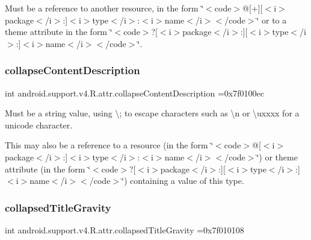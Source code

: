 Must be a reference to another resource, in the form \char`\"{}$<$code$>$@\mbox{[}+\mbox{]}\mbox{[}$<$i$>$package$<$/i$>$\+:\mbox{]}$<$i$>$type$<$/i$>$\+:$<$i$>$name$<$/i$>$$<$/code$>$\char`\"{} or to a theme attribute in the form \char`\"{}$<$code$>$?\mbox{[}$<$i$>$package$<$/i$>$\+:\mbox{]}\mbox{[}$<$i$>$type$<$/i$>$\+:\mbox{]}$<$i$>$name$<$/i$>$$<$/code$>$\char`\"{}. \mbox{\label{classandroid_1_1support_1_1v4_1_1R_1_1attr_ae883fcfe0059a7c95c4b5111529ff972}} 
\subsubsection{\texorpdfstring{collapse\+Content\+Description}{collapseContentDescription}}
{\footnotesize\ttfamily int android.\+support.\+v4.\+R.\+attr.\+collapse\+Content\+Description =0x7f0100ec\hspace{0.3cm}{\ttfamily [static]}}

Must be a string value, using \textquotesingle{}\textbackslash{};\textquotesingle{} to escape characters such as \textquotesingle{}\textbackslash{}n\textquotesingle{} or \textquotesingle{}\textbackslash{}uxxxx\textquotesingle{} for a unicode character. 

This may also be a reference to a resource (in the form \char`\"{}$<$code$>$@\mbox{[}$<$i$>$package$<$/i$>$\+:\mbox{]}$<$i$>$type$<$/i$>$\+:$<$i$>$name$<$/i$>$$<$/code$>$\char`\"{}) or theme attribute (in the form \char`\"{}$<$code$>$?\mbox{[}$<$i$>$package$<$/i$>$\+:\mbox{]}\mbox{[}$<$i$>$type$<$/i$>$\+:\mbox{]}$<$i$>$name$<$/i$>$$<$/code$>$\char`\"{}) containing a value of this type. \mbox{\label{classandroid_1_1support_1_1v4_1_1R_1_1attr_a6ab8e7ec74147d5da3f84ceae4fa0d09}} 
\subsubsection{\texorpdfstring{collapsed\+Title\+Gravity}{collapsedTitleGravity}}
{\footnotesize\ttfamily int android.\+support.\+v4.\+R.\+attr.\+collapsed\+Title\+Gravity =0x7f010108\hspace{0.3cm}{\ttfamily [static]}}

